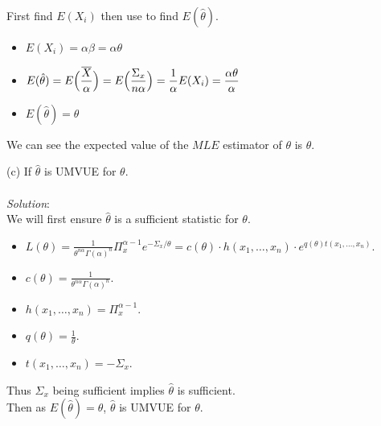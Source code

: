 \documentclass[12pt]{article}
\newcommand{\ds}{\displaystyle}
\begin{document}
\noindent
First find $ E(X_{i}) $ then use to find $ E(\hat{\theta}) $. \\

\begin{itemize}
    \item $ \ds E(X_{i}) = \alpha\beta = \alpha\theta $
    \item $ \ds E(\hat{\theta}) = E \Bigl( \frac{\overline{X}}{\alpha} \Bigr) = E \Bigl( \frac{\Sigma_{x}}{n\alpha} \Bigr) = \frac{1}{\alpha}E(X_{i}) = \frac{\alpha\theta }{\alpha} $
    \item $ \ds E(\hat{\theta}) = \theta $
\end{itemize}

\noindent
We can see the expected value of the $ MLE $ estimator of $ \theta $ is $ \theta $. \\

\vspace{2.5mm}

(c) If $ \hat{\theta} $ is UMVUE for $ \theta $. \\
\vspace{2.5mm} \\
\textit{Solution}:
\vspace{2.5mm} \\ 

\noindent
We will first ensure $ \hat{\theta} $ is a sufficient statistic for $ \theta $. \\

\begin{itemize}
    \item $ \ds L(\theta) = \frac{1}{\theta^{n\alpha}\Gamma(\alpha)^{n}} \Pi_{x}^{\alpha - 1} e^{-\Sigma_{x}/\theta} = c(\theta) \cdot h(x_{1}, \dots, x_{n}) \cdot e^{q(\theta)t(x_{1}, \dots, x_{n})}$.
    \item $ \ds c(\theta) = \frac{1}{\theta^{n\alpha}\Gamma(\alpha)^{n}} $.
    \item $ \ds h(x_{1}, \dots, x_{n}) = \Pi_{x}^{\alpha - 1} $.
    \item $ \ds q(\theta) = \frac{1}{\theta} $.
    \item $ \ds t(x_{1}, \dots, x_{n}) = -\Sigma_{x} $.
\end{itemize}

\noindent
Thus $ \Sigma_{x} $ being sufficient implies $ \hat{\theta} $ is sufficient. \\

\noindent
Then as $ \ds E(\hat{\theta}) = \theta $, $ \hat{\theta} $ is UMVUE for $ \theta $. \\
\end{document}
